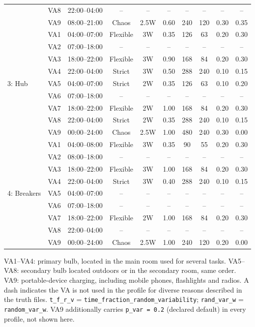 \documentclass[final,3p,times,onecolumn]{elsarticle}
\begin{document}
\begin{table}[H]
\begin{tabular}{llcccccccc}
& VA8 & 22:00--04:00 & -- & -- & -- & -- & -- & -- & --\\
& VA9 & 08:00--21:00 & Chaos    & 2.5W & 0.60 & 240 & 120 & 0.30 & 0.35 \\
\midrule
\multirow{9}{*}{3: Hub}
& VA1 & 04:00--07:00 & Flexible & 3W & 0.35 & 126 & 63  & 0.20 & 0.30 \\
& VA2 & 07:00--18:00 & -- & -- & -- & -- & -- & -- & -- \\
& VA3 & 18:00--22:00 & Flexible & 3W & 0.90 & 168 & 84  & 0.20 & 0.30 \\
& VA4 & 22:00--04:00 & Strict   & 3W & 0.50 & 288 & 240 & 0.10 & 0.15 \\
& VA5 & 04:00--07:00 & Strict & 2W & 0.35 & 126 & 63  & 0.10 & 0.20 \\
& VA6 & 07:00--18:00 & --       & -- & -- & --  & --  & -- & -- \\
& VA7 & 18:00--22:00 & Flexible & 2W & 1.00 & 168 & 84  & 0.20 & 0.30 \\
& VA8 & 22:00--04:00 & Strict   & 2W & 0.35 & 288 & 240 & 0.10 & 0.15 \\
& VA9 & 00:00--24:00 & Chaos    & 2.5W & 1.00 & 480 & 240 & 0.30 & 0.00 \\
\midrule
\multirow{9}{*}{4: Breakers}
& VA1 & 04:00--08:00 & Flexible & 3W & 0.35 & 90  & 55  & 0.20 & 0.30 \\
& VA2 & 08:00--18:00 & -- & -- & -- & -- & -- & -- & -- \\
& VA3 & 18:00--22:00 & Flexible   & 3W & 1.00 & 168 & 84  & 0.20 & 0.30 \\
& VA4 & 22:00--04:00 & Strict   & 3W & 0.40 & 288 & 240 & 0.10 & 0.15 \\
& VA5 & 04:00--07:00 & -- & -- & -- & -- & -- & -- & -- \\
& VA6 & 07:00--18:00 & -- & -- & -- & -- & -- & -- & -- \\
& VA7 & 18:00--22:00 & Flexible & 2W & 1.00 & 168  & 84  & 0.20 & 0.30 \\
& VA8 & 22:00--04:00 & -- & -- & -- & -- & -- & -- & -- \\
& VA9 & 00:00--24:00 & Chaos       & 2.5W & 1.00 & 240 & 120 & 0.20 & 0.00 \\
\bottomrule
\end{tabular}

\vspace{2pt}
{\footnotesize VA1--VA4: primary bulb, located in the main room used for several tasks. VA5--VA8: secondary bulb located outdoors or in the secondary room, same order. VA9: portable-device charging, including mobile phones, flashlights and radios. A dash indicates the VA is not used in the profile for diverse reasons described in the truth files. \texttt{t\_f\_r\_v} = \texttt{time\_fraction\_random\_variability}; \texttt{rand\_var\_w} = \texttt{random\_var\_w}. VA9 additionally carries \texttt{p\_var = 0.2} (declared default) in every profile, not shown here.}
\end{table}
\end{document}
